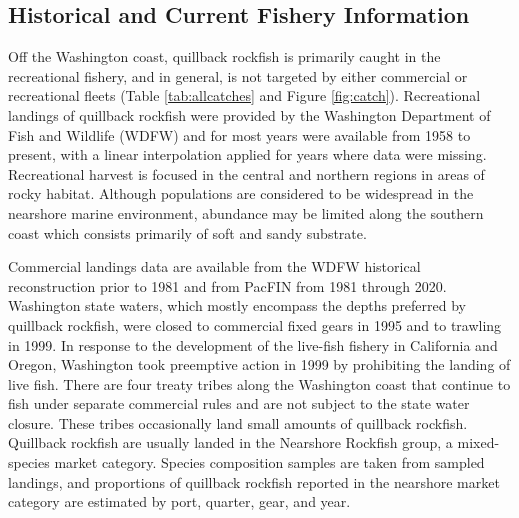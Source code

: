 \documentclass[11pt,
  english,
  a4paper,
]{article}
\begin{document}

\hypertarget{historical-and-current-fishery-information}{%
\subsection{Historical and Current Fishery Information}\label{historical-and-current-fishery-information}}

\leavevmode\tagmcend\tagstructend


Off the Washington coast, quillback rockfish is primarily caught in the recreational fishery, and in general, is not targeted by either commercial or recreational fleets (Table \ref{tab:allcatches} and Figure \ref{fig:catch}). Recreational landings of quillback rockfish were provided by the Washington Department of Fish and Wildlife (WDFW) and for most years were available from 1958 to present, with a linear interpolation applied for years where data were missing. Recreational harvest is focused in the central and northern regions in areas of rocky habitat. Although populations are considered to be widespread in the nearshore marine environment, abundance may be limited along the southern coast which consists primarily of soft and sandy substrate.

\leavevmode\tagmcend\tagstructend\par


Commercial landings data are available from the WDFW historical reconstruction prior to 1981 and from PacFIN from 1981 through 2020. Washington state waters, which mostly encompass the depths preferred by quillback rockfish, were closed to commercial fixed gears in 1995 and to trawling in 1999. In response to the development of the live-fish fishery in California and Oregon, Washington took preemptive action in 1999 by prohibiting the landing of live fish. There are four treaty tribes along the Washington coast that continue to fish under separate commercial rules and are not subject to the state water closure. These tribes occasionally land small amounts of quillback rockfish. Quillback rockfish are usually landed in the Nearshore Rockfish group, a mixed-species market category. Species composition samples are taken from sampled landings, and proportions of quillback rockfish reported in the nearshore market category are estimated by port, quarter, gear, and year.
\end{document}
